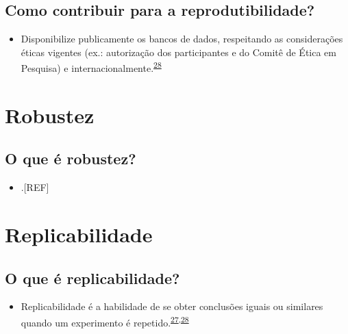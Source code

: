 \documentclass[
  a4paper,
]{book}
\providecommand{\tightlist}{%
  \setlength{\itemsep}{0pt}\setlength{\parskip}{0pt}}
\begin{document}
\hypertarget{como-contribuir-para-a-reprodutibilidade}{%
\subsection{Como contribuir para a reprodutibilidade?}\label{como-contribuir-para-a-reprodutibilidade}}

\begin{itemize}
\tightlist
\item
  Disponibilize publicamente os bancos de dados, respeitando as considerações éticas vigentes (ex.: autorização dos participantes e do Comitê de Ética em Pesquisa) e internacionalmente.\textsuperscript{\protect\hyperlink{ref-mair2016}{28}}
\end{itemize}

\hypertarget{robustez}{%
\section{Robustez}\label{robustez}}

\hypertarget{o-que-uxe9-robustez}{%
\subsection{O que é robustez?}\label{o-que-uxe9-robustez}}

\begin{itemize}
\tightlist
\item
  .{[}REF{]}
\end{itemize}

\hypertarget{replicabilidade}{%
\section{Replicabilidade}\label{replicabilidade}}

\hypertarget{o-que-uxe9-replicabilidade}{%
\subsection{O que é replicabilidade?}\label{o-que-uxe9-replicabilidade}}

\begin{itemize}
\tightlist
\item
  Replicabilidade é a habilidade de se obter conclusões iguais ou similares quando um experimento é repetido.\textsuperscript{\protect\hyperlink{ref-hofner2015}{27},\protect\hyperlink{ref-mair2016}{28}}
\end{itemize}
\end{document}
